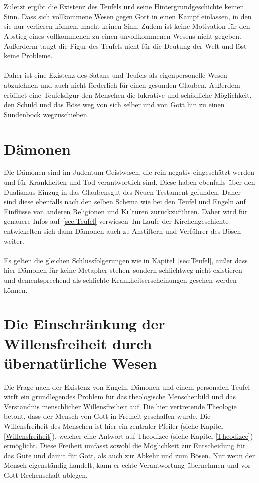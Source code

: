 \\~\\
Zuletzt ergibt die Existenz des Teufels und seine Hintergrundgeschichte keinen Sinn. Dass sich vollkommene Wesen gegen Gott in einen Kampf einlassen, in den sie nur verlieren können, macht keinen Sinn. Zudem ist keine Motivation für den Abstieg eines vollkommenen zu einen unvollkommenen Wesens nicht gegeben.
Außerderm taugt die Figur des Teufels nicht für die Deutung der Welt und löst keine Probleme.
\\~\\
Daher ist eine Existenz des Satans und Teufels als eigenpersonelle Wesen abzulehnen und auch nicht förderlich für einen gesunden Glauben. Außerdem eröffnet eine Teufelsfigur den Menschen die lukrative und schädliche Möglichkeit, den Schuld und das Böse weg von sich selber und von Gott hin zu einen Sündenbock wegzuschieben.

\section{Dämonen}
Die Dämonen sind im Judentum Geistwesen, die rein negativ eingeschätzt werden und für Krankheiten und Tod verantwortlich sind. Diese haben ebenfalls über den Dualismus Einzug in das Glaubensgut des Neuen Testament gefunden. Daher sind diese ebenfalls nach den selben Schema wie bei den Teufel und Engeln auf Einflüsse von anderen Religionen und Kulturen zurückzuführen. Daher wird für genauere Infos auf\ \ref{sec:Teufel} verwiesen. Im Laufe der Kirchengeschichte entwickelten sich dann Dämonen auch zu Anstiftern und Verführer des Bösen weiter.
\\~\\
Es gelten die gleichen Schlussfolgerungen wie in Kapitel\ \ref{sec:Teufel}, außer dass hier Dämonen für keine Metapher stehen, sondern schlichtweg nicht existieren und dementsprechend als schlichte Krankheitserscheinungen gesehen werden können.

\section{Die Einschränkung der Willensfreiheit durch übernatürliche Wesen}
Die Frage nach der Existenz von Engeln, Dämonen und einem personalen Teufel wirft ein grundlegendes Problem für das theologische Menschenbild und das Verständnis menschlicher Willensfreiheit auf. Die hier vertretende Theologie betont, dass der Mensch von Gott in Freiheit geschaffen wurde. Die Willensfreiheit des Menschen ist hier ein zentraler Pfeiler (siehe Kapitel \ref{Willensfreiheit}), welcher eine Antwort auf Theodizee (siehe Kapitel \ref{Theodizee}) ermöglicht. Diese Freiheit umfasst sowohl die Möglichkeit zur Entscheidung für das Gute und damit für Gott, als auch zur Abkehr und zum Bösen. Nur wenn der Mensch eigenständig handelt, kann er echte Verantwortung übernehmen und vor Gott Rechenschaft ablegen.\\


